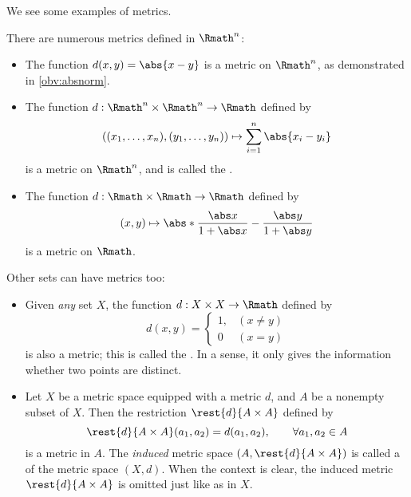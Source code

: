 We see some examples of metrics.
\begin{example}
    \label{exm:metric}
    There are numerous metrics defined in \(\Rmath^n\):
    \begin{itemize}
        \item The function \(d(x,y)=\abs{x-y}\)
        is a metric on \(\Rmath^n\),
        as demonstrated in \cref{obv:absnorm}.
        
        \item The function \(d:\Rmath^n\times\Rmath^n\to\Rmath\)
        defined by
        \[
            ((x_1,\dots,x_n),(y_1,\dots,y_n))
            \mapsto\sum_{i=1}^{n}\abs{x_i-y_i}
        \]
        is a metric on \(\Rmath^n\),
        and is called the .

        \item The function \(d:\Rmath\times\Rmath\to\Rmath\)
        defined by
        \[
            (x,y)\mapsto
            \abs*{\frac{\abs x}{1+\abs x}-\frac{\abs y}{1+\abs y}}
        \]
        is a metric on \(\Rmath\).
    \end{itemize}

    Other sets can have metrics too:
    \begin{itemize}
        \item Given \emph{any} set \(X\),
        the function \(d:X\times X\to\Rmath\) defined by
        \[
            d(x,y)
            =\begin{cases}
                1, & (x\neq y) \\
                0 & (x=y)
            \end{cases}
        \]
        is also a metric;
        this is called the .
        In a sense,
        it only gives the information whether two points are distinct.

        \item Let \(X\) be a metric space equipped with a metric \(d\),
        and \(A\) be a nonempty subset of \(X\).
        Then the restriction \(\rest{d}{A\times A}\) defined by
        \[
            \rest{d}{A\times A}(a_1,a_2)
            =d(a_1,a_2),
            \qquad
            \forall a_1,a_2\in A
        \]
        is a metric in \(A\).
        The \emph{induced} metric space \((A,\rest{d}{A\times A})\)
        is called a  of the metric space \((X,d)\).
        When the context is clear,
        the induced metric \(\rest{d}{A\times A}\) is omitted
        just like as in \(X\).
    \end{itemize}
\end{example}


